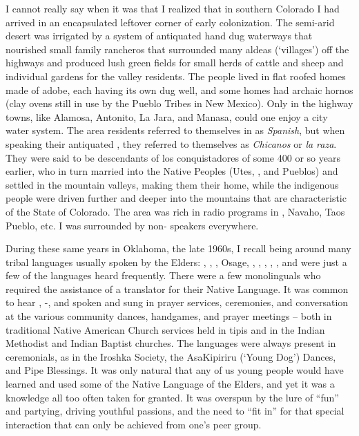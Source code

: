 \documentclass[output=paper]{LSP/langsci}
\begin{document}
I cannot really say when it was that I realized that in southern Colorado I had arrived in an encapsulated leftover corner of early  colonization. The semi-arid desert was irrigated by a system of antiquated hand dug waterways that nourished small family rancheros that surrounded many aldeas (`villages') off the highways and produced lush green fields for small herds of cattle and sheep and individual gardens for the valley residents. The people lived in flat roofed homes made of adobe, each having its own dug well, and some homes had archaic hornos (clay ovens still in use by the Pueblo Tribes in New Mexico). Only in the highway towns, like Alamosa, Antonito, La Jara, and Manasa, could one enjoy a city water system. The area residents referred to themselves in  as \emph{Spanish}, but when speaking their antiquated , they referred to themselves as \emph{Chicanos} or \emph{la raza}. They were said to be descendants of los conquistadores of some 400 or so years earlier, who in turn married into the Native Peoples (Utes, , and Pueblos) and settled in the mountain valleys, making them their home, while the indigenous people were driven further and deeper into the mountains that are characteristic of the State of Colorado. The area was rich in radio programs in , Navaho, Taos Pueblo, etc. I was surrounded by non- speakers everywhere.

During these same years in Oklahoma, the late 1960s, I recall being around many tribal languages usually spoken by the Elders: , , , O\-sage, , , , , , and  were just a few of the languages heard frequently. There were a few monolinguals who required the assistance of a translator for their Native Language. It was common to hear , -, and  spoken and sung in prayer services, ceremonies, and conversation at the various community dances, handgames, and prayer meetings -- both in traditional Native American Church services held in tipis and in the Indian Methodist and Indian Baptist churches. The languages were always present in ceremonials, as in the Iroshka Society, the AsaKipiriru (`Young Dog') Dances, and Pipe Blessings. It was only natural that any of us young people would have learned and used some of the Native Language of the Elders, and yet it was a knowledge all too often taken for granted. It was overspun by the lure of ``fun'' and partying, driving youthful passions, and the need to ``fit in'' for that special interaction that can only be achieved from one's peer group.
\end{document}
